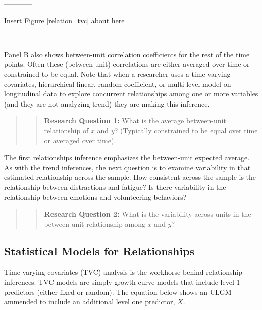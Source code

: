 \documentclass[english,,man]{apa6}
\theoremstyle{definition}
\theoremstyle{definition}
\theoremstyle{definition}
\theoremstyle{remark}
\begin{document}
\begin{center}

------------

Insert Figure \ref{relation_tvc} about here

------------

\end{center}

Panel B also shows between-unit correlation coefficients for the rest of
the time points. Often these (between-unit) correlations are either
averaged over time or constrained to be equal. Note that when a
researcher uses a time-varying covariates, hierarchical linear,
random-coefficient, or multi-level model on longitudinal data to explore
concurrent relationships among one or more variables (and they are not
analyzing trend) they are making this inference.

\begin{quote}
\begin{quote}
\textbf{Research Question 1:} What is the average between-unit
relationship of \(x\) and \(y\)? (Typically constrained to be equal over
time or averaged over time).
\end{quote}
\end{quote}

The first relationships inference emphasizes the between-unit expected
average. As with the trend inferences, the next question is to examine
variability in that estimated relationship across the sample. How
consistent across the sample is the relationship between distractions
and fatigue? Is there variability in the relationship between emotions
and volunteering behaviors?

\begin{quote}
\begin{quote}
\textbf{Research Question 2:} What is the variability across units in
the between-unit relationship among \(x\) and \(y\)?
\end{quote}
\end{quote}

\hypertarget{statistical-models-for-relationships}{%
\subsection{Statistical Models for
Relationships}\label{statistical-models-for-relationships}}

Time-varying covariates (TVC) analysis is the workhorse behind
relationship inferences. TVC models are simply growth curve models that
include level 1 predictors (either fixed or random). The equation below
shows an ULGM ammended to include an additional level one predictor,
\(X\).
\end{document}
